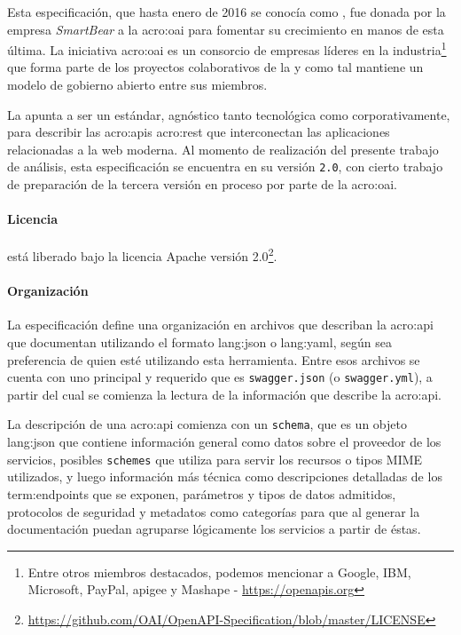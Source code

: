 \subsubsection{}
\label{soa:tecnologias:openapi-spec}

Esta especificación, que hasta enero de 2016 se conocía como , fue donada por la empresa \textit{SmartBear} a la \gls{acro:oai} para fomentar su crecimiento en manos de esta última. La iniciativa \gls{acro:oai} es un consorcio de empresas líderes en la industria\footnote{Entre otros miembros destacados, podemos mencionar a Google, IBM, Microsoft, PayPal, apigee y Mashape - \url{https://openapis.org}} que forma parte de los proyectos colaborativos de la  y como tal mantiene un modelo de gobierno abierto entre sus miembros.

La {\oaispec} apunta a ser un estándar, agnóstico tanto tecnológica como corporativamente, para describir las \glspl{acro:api} \gls{acro:rest} que interconectan las aplicaciones relacionadas a la web moderna. Al momento de realización del presente trabajo de análisis, esta especificación se encuentra en su versión \texttt{2.0}, con cierto trabajo de preparación de la tercera versión en proceso por parte de la \gls{acro:oai}.

\paragraph{Licencia}

{\oaispec} está liberado bajo la licencia Apache versión 2.0\footnote{\url{https://github.com/OAI/OpenAPI-Specification/blob/master/LICENSE}}.

\paragraph{Organización}

La especificación define una organización en archivos que describan la \gls{acro:api} que documentan utilizando el formato \gls{lang:json} o \gls{lang:yaml}, según sea preferencia de quien esté utilizando esta herramienta. Entre esos archivos se cuenta con uno principal y requerido que es \texttt{swagger.json} (o \texttt{swagger.yml}), a partir del cual se comienza la lectura de la información que describe la \gls{acro:api}.

La descripción de una \gls{acro:api} comienza con un \texttt{schema}, que es un objeto \gls{lang:json} que contiene información general como datos sobre el proveedor de los servicios, posibles \texttt{schemes} que utiliza para servir los recursos o tipos MIME utilizados, y luego información más técnica como descripciones detalladas de los \glspl{term:endpoint} que se exponen, parámetros y tipos de datos admitidos, protocolos de seguridad y metadatos como categorías para que al generar la documentación puedan agruparse lógicamente los servicios a partir de éstas.

